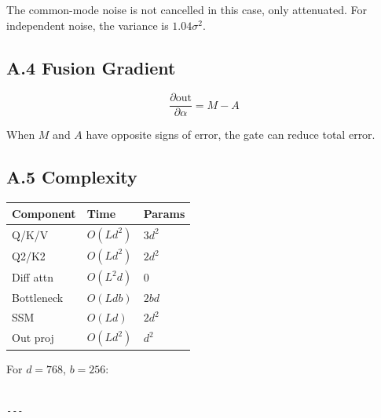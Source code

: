 The common-mode noise is not cancelled in this case, only attenuated. For 
independent noise, the variance is $1.04 \sigma^2$.

\subsection{A.4 Fusion Gradient}

\[
\frac{\partial \text{out}}{\partial \alpha} = M - A
\tag{A.7}
\]

When $M$ and $A$ have opposite signs of error, the gate can reduce total 
error.

\subsection{A.5 Complexity}

\begin{table}[H]
\centering
\small
\begin{tabular}{lll}
\toprule
\textbf{Component} & \textbf{Time} & \textbf{Params} \\
\midrule
Q/K/V & $O(L d^2)$ & $3 d^2$ \\
Q2/K2 & $O(L d^2)$ & $2 d^2$ \\
Diff attn & $O(L^2 d)$ & 0 \\
Bottleneck & $O(L d b)$ & $2 b d$ \\
SSM & $O(L d)$ & $2 d^2$ \\
Out proj & $O(L d^2)$ & $d^2$ \\
\bottomrule
\end{tabular}
\end{table}

For $d = 768$, $b = 256$:

\begin{lstlisting}

---
\end{lstlisting}